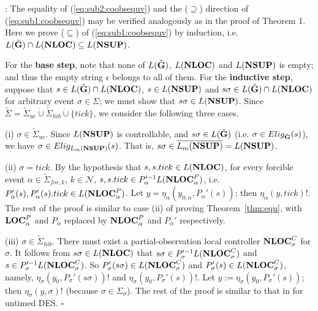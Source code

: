 \vspace{2em}
: The equality of (\ref{eq:sub2:coobsequv}) and the ($\supseteq$)
direction of (\ref{eq:sub1:coobsequv}) may be verified analogously
as in the proof of Theorem 1. Here we prove ($\subseteq$) of (\ref{eq:sub1:coobsequv})
by induction, i.e. $L(\tilde{\bf G}) \cap L({\bf NLOC}) \subseteq L({\bf NSUP})$.

For the {\bf base step}, note that none of $L(\tilde{\bf G})$, $L({\bf NLOC})$ and
$L({\bf NSUP})$ is empty; and thus the empty string $\epsilon$ belongs to all
of them. For the {\bf inductive step}, suppose that $s \in L(\tilde{\bf G}) \cap
L({\bf NLOC})$, $s \in L({\bf NSUP})$ and $s\sigma \in L(\tilde{\bf G}) \cap
L({\bf NLOC})$ for arbitrary event $\sigma \in \Sigma$; we must show that $s\sigma
\in L({\bf NSUP})$. Since $\tilde\Sigma = \tilde\Sigma_{uc}\dot\cup \tilde\Sigma_{hib}
\dot\cup\{tick\}$, we consider the following three cases.

(i) $\sigma \in \tilde\Sigma_{uc}$. Since $L({\bf NSUP})$ is controllable, and
$s\sigma \in L(\tilde{\bf G})$ (i.e. $\sigma \in Elig_{\tilde{\bf G}}(s)$), we have
$\sigma \in Elig_{L_m({\bf NSUP})}(s)$. That is, $s\sigma \in
\overline{L_m({\bf NSUP})} = L({\bf NSUP})$.

(ii) $\sigma = tick$. By the hypothesis that $s, s.tick \in L({\bf NLOC})$,
for every forcible event $\alpha \in \tilde\Sigma_{for,k}$, $k \in \mathcal{N}$,
$s, s.tick \in P_{\alpha}'^{-1}L({\bf NLOC}_{\alpha}^P)$, i.e. $P_{\alpha}'(s),
P_{\alpha}'(s).tick \in L({\bf NLOC}_{\alpha}^P)$. Let $y = \eta_\alpha(y_{0,\alpha},
P_{\alpha}'(s))$; then $\eta_\alpha(y,tick)!$. The rest of the proof is similar to
case (ii) of proving Theorem~\ref{thm:equ}, with ${\bf LOC}_{\alpha}^P$ and $P_\alpha$
replaced by ${\bf NLOC}_{\alpha}^P$ and $P_{\alpha}'$ respectively.


(iii) $\sigma \in \tilde\Sigma_{hib}$. There must exist a partial-observation local
controller ${\bf NLOC}_{\sigma}^C$ for $\sigma$. It follows from $s\sigma \in
L({\bf NLOC})$ that $s\sigma \in P_{\sigma}'^{-1}L({\bf NLOC}_{\sigma}^C)$ and
$s \in P_{\sigma}'^{-1}L({\bf NLOC}_{\sigma}^C)$. So $P_{\sigma}'(s\sigma)
\in L({\bf NLOC}_{\sigma}^C)$ and $P_{\sigma}'(s) \in L({\bf NLOC}_{\sigma}^C)$,
namely, $\eta_{\sigma}(y_0,P_{\sigma}'(s\sigma))!$ and $\eta_{\sigma}(y_0,
P_{\sigma}'(s))!$. Let $y := \eta_{\sigma}(y_0,P_{\sigma}'(s))$; then
$\eta_{\sigma}(y,\sigma)!$ (because $\sigma \in \Sigma_{\sigma}$).
The rest of the proof is similar to that
in \cite{ZhangCW17} for untimed DES. \hfill $\square$









